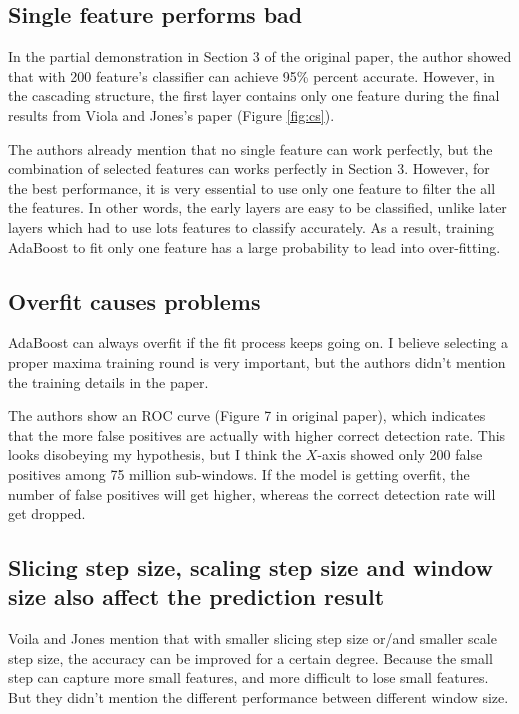 \documentclass[10pt,twocolumn,letterpaper]{article}
\begin{document}
\subsection{Single feature performs bad}
In the partial demonstration in Section 3 of the original paper, the author showed that with 200 feature's classifier can achieve 95\% percent accurate.
However, in the cascading structure, the first layer contains only one feature during the final results from Viola and Jones's paper (Figure \ref{fig:cs}).

The authors already mention that no single feature can work perfectly, but the combination of selected features can works perfectly in Section 3.
However, for the best performance, it is very essential to use only one feature to filter the all the features.
In other words, the early layers are easy to be classified, unlike later layers which had to use lots features to classify accurately.
As a result, training AdaBoost to fit only one feature has a large probability to lead into over-fitting.

\subsection{Overfit causes problems}
AdaBoost can always overfit if the fit process keeps going on.
I believe selecting a proper maxima training round is very important, but the authors didn't mention the training details in the paper.

The authors show an ROC curve (Figure 7 in original paper), which indicates that the more false positives are actually with higher correct detection rate.
This looks disobeying my hypothesis, but I think the $X$-axis showed only 200 false positives among 75 million sub-windows.
If the model is getting overfit, the number of false positives will get higher, whereas the correct detection rate will get dropped.

\subsection{Slicing step size, scaling step size and window size also affect the prediction result}
Voila and Jones mention that with smaller slicing step size or/and smaller scale step size, the accuracy can be improved for a certain degree.
Because the small step can capture more small features, and more difficult to lose small features.
But they didn't mention the different performance between different window size.
\end{document}
